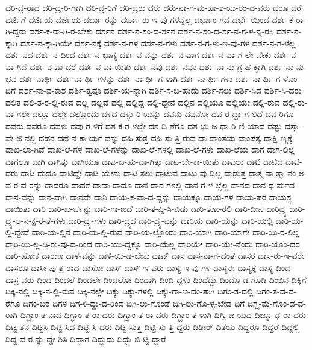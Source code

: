 {ದರಿ-ದ್ರ-ರಾದ
ದರಿ-ದ್ರ-ರಿ-ಗಾಗಿ
ದರಿ-ದ್ರ-ರಿಗೆ
ದರಿ-ದ್ರರು
ದರು
ದರು-ನಾ-ಗ-ಮ-ಹಾ-ಶ-ಯ-ರಂ-ಥ-ವರು
ದರೂ
ದರೆ
ದರ್ಜಿಗೆ
ದರ್ಜಿಯ
ದರ್ಜೆಯ
ದರ್ಬಾ-ರನ್ನು
ದರ್ಬಾ-ರು-ಇ-ವು-ಗಳನ್ನೆಲ್ಲ
ದರ್ಭಾಂ-ಗದ
ದರ್ಭೆ-ಯಿಂದ
ದರ್ಶ-ಕ-ರಾ-ಗಿ-ದ್ದರು
ದರ್ಶ-ಕ-ರಾ-ಗಿ-ರ-ಬೇಕು
ದರ್ಶನ
ದರ್ಶ-ನ-ಸಂ-ದ-ರ್ಶನ
ದರ್ಶ-ನ-ಸಂ-ದ-ರ್ಶ-ನ-ಗ-ಳ-ನ್ನ-ರಸಿ
ದರ್ಶ-ನ-ಕ್ಕಾಗಿ
ದರ್ಶ-ನ-ಕ್ಕಾ-ಗಿಯೇ
ದರ್ಶ-ನಕ್ಕೆ
ದರ್ಶ-ನ-ಗಳ
ದರ್ಶ-ನ-ಗಳು
ದರ್ಶ-ನ-ಗ-ಳು-ಇ-ವು-ಗಳ
ದರ್ಶ-ನ-ಗ-ಳೆಲ್ಲ
ದರ್ಶ-ನದ
ದರ್ಶ-ನ-ದಿಂದ
ದರ್ಶ-ನ-ಭಾಗ್ಯ
ದರ್ಶ-ನ-ವನ್ನು
ದರ್ಶ-ನ-ವಾಗ
ದರ್ಶ-ನ-ವಾ-ಗ-ಲೇ-ಬೇಕು
ದರ್ಶ-ನ-ವಾ-ಗಿದೆ
ದರ್ಶ-ನ-ವಾ-ದರೆ
ದರ್ಶ-ನ-ವಾ-ಯಿತು
ದರ್ಶ-ನವು
ದರ್ಶ-ನವೂ
ದರ್ಶ-ನಾ-ನು-ಗ್ರ-ಹ-ಕ್ಕಾಗಿ
ದರ್ಶ-ನಾ-ನು-ಭವ
ದರ್ಶ-ನಾರ್ಥಿ
ದರ್ಶ-ನಾ-ರ್ಥಿ-ಗಳನ್ನು
ದರ್ಶ-ನಾ-ರ್ಥಿ-ಗ-ಳಾಗಿ
ದರ್ಶ-ನಾ-ರ್ಥಿ-ಗಳು
ದರ್ಶ-ನಾ-ರ್ಥಿ-ಗ-ಳೊಂ-ದಿಗೆ
ದರ್ಶ-ನಾ-ವ-ಕಾಶ
ದರ್ಶಿ-ತ್ವವೂ
ದರ್ಶಿ-ಯ-ನ್ನಾಗಿ
ದರ್ಶಿ-ಸ-ಬ-ಹುದು
ದರ್ಶಿ-ಸಲು
ದರ್ಶಿ-ಸಿದ
ದರ್ಶಿ-ಸಿ-ದರು
ದಲಿತ
ದಲಿ-ತ-ರ-ಲ್ಲಿ-ರುವ
ದಲ್ಲ
ದಲ್ಲವೆ
ದಲ್ಲಿ
ದಲ್ಲಿದ್ದ
ದಲ್ಲಿ-ದ್ದೇನೆ
ದಲ್ಲಿನ
ದಲ್ಲಿಯೂ
ದಲ್ಲಿಯೇ
ದಲ್ಲಿ-ರುವ
ದಲ್ಲಿ-ರು-ವಾ-ಗಲೇ
ದಲ್ಲೂ
ದಲ್ಲೇ
ದಲ್ಲೊಂದು
ದಳದ
ದಳ್ಳು-ರಿ-ಯನ್ನು
ದವನು
ದವನೋ
ದವ-ರ-ದ್ದಾ-ಗ-ಲಿದೆ
ದವ-ರಿಗೂ
ದವರು
ದವರೂ
ದವಳು
ದವು-ಗ-ಳಿಗೆ
ದಶ-ಕ-ಗ-ಳಲ್ಲೇ
ದಶ-ದಿ-ಶೆಗೂ
ದಶ-ಭು-ಜ-ಧಾ-ರಿ-ಣಿ-ಯಾದ
ದಷ್ಟು
ದಸ್ತಾ-ವೇ-ಜಿ-ನಲ್ಲಿ
ದಹನ
ದಹ-ನ-ಕಾ-ರ್ಯ-ವನ್ನು
ದಹಿ-ಸುತ್ತ
ದಹಿ-ಸು-ತ್ತಿ-ರುವ
ದಾ
ದಾಂತೆಯ
ದಾಂಪತ್ಯ
ದಾಕ್ಷಿ-ಣ್ಯಕ್ಕೆ
ದಾಖ-ಲಾ-ಗಿವೆ
ದಾಖ-ಲೆ-ಗಳ
ದಾಖ-ಲೆ-ಗಳನ್ನು
ದಾಖ-ಲೆ-ಗಳಲ್ಲಿ
ದಾಖ-ಲೆ-ಗಳು
ದಾಖ-ಲೆಯ
ದಾಗ
ದಾಗ-ಲಿಲ್ಲ
ದಾಗಲೂ
ದಾಗಿ
ದಾಗಿತ್ತು
ದಾಗಿಯೂ
ದಾಟ-ಬ-ಹು-ದಾ-ಗಿತ್ತು
ದಾಟ-ಬೇ-ಕಾ-ಯಿತು
ದಾಟಲು
ದಾಟಿ
ದಾಟಿದ
ದಾಟಿ-ದರು
ದಾಟಿ-ದುದೂ
ದಾಟಿದ್ದೇ
ದಾಟಿ-ಯೇನು
ದಾಟಿ-ಸಲು
ದಾಟುವ
ದಾಟು-ವು-ದಿಲ್ಲ
ದಾಡುತ್ತ
ದಾತ್ಮ-ನಾ-ತ್ಮಾ-ನಂ-ಅ-ವ-ರ-ವ-ರನ್ನು
ದಾದರೂ
ದಾದರೆ
ದಾದಾ
ದಾದೂ
ದಾನ
ದಾನ-ಗಳಲ್ಲಿ
ದಾನ-ಗ-ಳ-ಲ್ಲೆಲ್ಲ
ದಾನದ
ದಾನ-ಧ-ರ್ಮದ
ದಾನ-ವನ್ನು
ದಾನ-ವಾಗಿ
ದಾನವೇ
ದಾನಿ
ದಾಯ-ಕ-ವಾ-ದ-ದ್ದನ್ನು
ದಾಯಕ್ಕೂ
ದಾಯ-ಗಳ
ದಾಯ-ಪರ
ದಾಯಸ್ಥ
ದಾಯಿತು
ದಾರಿ
ದಾರಿ-ಖ-ರ್ಚನ್ನು
ದಾರಿ-ಗಾ-ಣದೆ
ದಾರಿ-ತ-ಪ್ಪಿ-ಸಿ-ಬಿಡು
ದಾರಿ-ತೋ-ರಲಿ
ದಾರಿ-ದೀಪ
ದಾರಿದ್ರ್ಯ
ದಾರಿ-ದ್ರ್ಯ-ಅ-ನ-ಕ್ಷ-ರ-ತೆ-ಗಳು
ದಾರಿ-ದ್ರ್ಯ-ಗಳು
ದಾರಿ-ದ್ರ್ಯದ
ದಾರಿ-ದ್ರ್ಯ-ವನ್ನು
ದಾರಿಯ
ದಾರಿ-ಯನ್ನು
ದಾರಿ-ಯಲ್ಲಿ
ದಾರಿ-ಯ-ಲ್ಲಿ-ದ್ದೇವೆ
ದಾರಿ-ಯ-ಲ್ಲಿನ
ದಾರಿ-ಯ-ಲ್ಲಿ-ರುವ
ದಾರಿ-ಯ-ಲ್ಲೊಂದು
ದಾರಿ-ಯಾಗಿ
ದಾರಿ-ಯಾಗೇ
ದಾರಿ-ಯಿ-ರ-ಲಿಲ್ಲ
ದಾರಿ-ಯಿ-ಲ್ಲ-ದಿ-ರು-ವು-ದ-ರಿಂದ
ದಾರಿ-ಯು-ದ್ದಕ್ಕೂ
ದಾರಿ-ಯೆಲ್ಲ
ದಾರಿಯೇ
ದಾರಿ-ಯೇ-ನೆಂದು
ದಾರಿ-ಯೊಂ-ದರ
ದಾರಿ-ಹೋಕ
ದಾರುಣ
ದಾಳ-ವನ್ನು
ದಾಳಿ-ಯಿ-ಡ-ಬೇಕು
ದಾವ್
ದಾಸ
ದಾಸ-ನಾ-ಗ-ದಂತೆ
ದಾಸರ
ದಾಸ-ರು-ಇ-ವರೇ
ದಾಸರೂ
ದಾಸೀ-ಪು-ತ್ರ-ರಾದ
ದಾಸೋ
ದಾಸ್
ದಾಸ್-ಇ-ವರು
ದಾಸ್ಯ-ಇ-ವು-ಗಳ
ದಾಸ್ಯಈ
ದಾಸ್ಯಕ್ಕೆ
ದಾಸ್ಯ-ದಿಂದ
ದಾಸ್ರ-ವರು
ದಿಂದ
ದಿಂದಲೆ
ದಿಂದಲೇ
ದಿಂದಲೋ
ದಿಂದಾಗಿ
ದಿಂದಿ-ದ್ದಳು
ದಿಂದೆದ್ದು
ದಿಂದೊ-ಡ-ಗೂಡಿ
ದಿಂಬಿನ
ದಿಕ್ಕಿಗೆ
ದಿಕ್ಕಿ-ನಲ್ಲಿ
ದಿಕ್ಕಿ-ನ-ಲ್ಲಿ-ರುವ
ದಿಕ್ಕಿ-ನಲ್ಲೇ
ದಿಕ್ಕು
ದಿಕ್ಕು-ಗಳಲ್ಲಿ
ದಿಕ್ಕು-ಗಾ-ಣ-ದಂ-ತಾಗಿ
ದಿಗಂ-ತ-ದಲ್ಲಿ
ದಿಗಂ-ತ-ದ-ವ-ರೆಗೂ
ದಿಗಂ-ಬರ
ದಿಗಳ
ದಿಗ-ಳಿ-ದ್ದು-ದ-ರಿಂದ
ದಿಗಿ-ಲು-ಗೊಂಡೆ
ದಿಗಿ-ಲು-ಗೊ-ಳ್ಳ-ಬೇಡ
ದಿಗೆ
ದಿಗ್ಬ್ರ-ಮೆ-ಗೊಂ-ಡ-ವ-ರಾಗಿ
ದಿಗ್ಬ್ರಾಂ-ತ-ನಾದ
ದಿಗ್ಭಾಂ-ತ-ರಾ-ದರು
ದಿಗ್ಭ್ರಾಂ-ತ-ರಾ-ದರು
ದಿಗ್ಭ್ರಾಂ-ತ-ಳಾಗಿ
ದಿಗ್ವಿ-ಜ-ಯದ
ದಿಙ್ಮೂ-ಢ-ರಾ-ದರು
ದಿಟ್ಟ-ತನ
ದಿಟ್ಟಿಸಿ
ದಿಟ್ಟಿ-ಸಿದ
ದಿಟ್ಟಿ-ಸಿ-ದರು
ದಿಟ್ಟಿ-ಸುತ್ತ
ದಿಟ್ಟಿ-ಸು-ತ್ತಿ-ದ್ದರು
ದಿಢೀರ್
ದಿತೆಯ
ದಿದ್ದರೂ
ದಿದ್ದರೆ
ದಿದ್ದಲ್ಲಿ
ದಿದ್ದ-ವ-ರ-ನ್ನು-ದ್ದೇ-ಶಿಸಿ
ದಿದ್ದಾಗ
ದಿದ್ದುದು
ದಿದ್ದು-ಬಿ-ಟ್ಟಿ-ದ್ದಾರೆ
}
